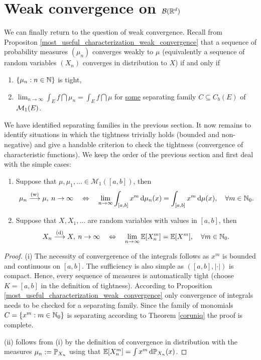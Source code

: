 \section[Weak convergence on $\mathcal B(\R)$]{Weak convergence on $\mathcal B(\R^d)$}
We can finally return to the question of weak convergence. Recall from Propositon \ref{most_useful_characterization_weak_convergence} that a sequence of probability measures $(\mu_n)$ converges weakly to $\mu$ (equivalently a sequence of random variables $(X_n)$ converges in distribution to $X$) if and only if
\begin{enumerate}[label=(\roman*)]
	\item $\{\mu_n:n\in\N\}$ is tight,
	\item $ \lim_{n\to\infty} \int_E f \dint \mu_n = \int_E f \dint \mu$ for \underline{some} separating family $C \subseteq C_b(E)$ of $\cM_1(E)$.
\end{enumerate}
We have identified separating families in the previous section. It now remains to identify situations in which the tightness trivially holds (bounded and non-negative) and give a handable criterion to check the tightness (convergence of characteristic functions). We keep the order of the previous section and first deal with the simple cases:
\begin{lsatzwichtig}
\begin{theorem}
	\begin{enumerate}[label=(\roman*)]
		\item Suppose that $\mu,\mu_1,...\in \mathcal M_1([a,b])$, then 
	\begin{align*}
		\mu_n \overset{\text{(w)}}{\longrightarrow} \mu,\: n \to \infty \quad\Leftrightarrow \quad \lim_{n\to\infty}\int_{[a,b]} x^m\dint \mu_n(x)=\int_{[a,b]} x^m\dint \mu(x),\quad \forall m\in\N_0.
	\end{align*}
	\item Suppose that $X,X_1,...$ are random variables with values in $[a,b]$, then 
	\begin{align*}
		X_n \overset{\text{(d)}}{\longrightarrow} X,\: n \to \infty \quad\Leftrightarrow \quad \lim_{n\to\infty}\E[X_n^m]=\E[X^m], \quad \forall m\in\N_0.
	\end{align*}
\end{enumerate}
\end{theorem}
\end{lsatzwichtig}
\begin{proof}[Proof]
	(i) The necessity of convergerence of the integrals follows as $x^m$ is bounded and continuous on $[a,b]$. The sufficiency is also simple as $([a,b],|\cdot|)$ is compact. Hence, every sequence of measures is automatically tight (choose $K=[a,b]$ in the definition of tightness). According to Proposition \ref{most_useful_characterization_weak_convergence} only convergence of integrals needs to be checked for a separating family. Since the family of monomials $C=\{x^m:m\in\N_0\}$ is separating according to Theorem \ref{coruniq} the proof is complete.\smallskip

	(ii) follows from (i) by the definition of convergence in distribution with the measures $\mu_n:=\P_{X_n}$ using that $\E[X_n^m]=\int x^m \dint \P_{X_n}(x)$.\smallskip
\end{proof}

